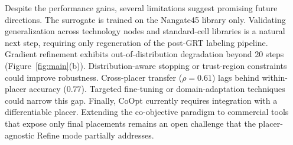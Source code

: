 \documentclass[sigconf,anonymous,review,9pt]{acmart}
\begin{document}
Despite the performance gains, several limitations suggest promising future directions. The surrogate is trained on the Nangate45 library only. Validating
generalization across technology nodes and standard-cell libraries is
a natural next step, requiring only regeneration of the post-GRT
labeling pipeline. Gradient refinement exhibits out-of-distribution
degradation beyond 20 steps (Figure~\ref{fig:main}(b)).
Distribution-aware stopping or trust-region constraints could improve
robustness. Cross-placer transfer ($\rho = 0.61$) lags behind
within-placer accuracy ($0.77$). Targeted fine-tuning or
domain-adaptation techniques could narrow this gap. Finally, CoOpt
currently requires integration with a differentiable placer.
Extending the co-objective paradigm to commercial tools that expose
only final placements remains an open challenge that the
placer-agnostic Refine mode partially addresses.

 
\newpage


\end{document}
